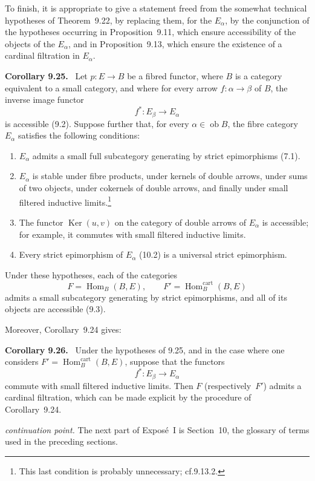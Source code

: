\documentclass[11pt]{article}
\newcommand{\ob}{\operatorname{ob}}
\newcommand{\Ker}{\operatorname{Ker}}
\newcommand{\Hhom}{\operatorname{Hom}}
\newcommand{\Hhomcart}{\operatorname{Hom}^{\mathrm{cart}}}
\newcommand{\cf}{cf.}
\newcommand{\resp}{respectively\ }
\newenvironment{statement}[1]{\par\medskip\noindent\textbf{#1.}\ }{\par\medskip}
\begin{document}
To finish, it is appropriate to give a statement freed from the somewhat technical hypotheses of Theorem~9.22, by replacing them, for the $E_\alpha$, by the conjunction of the hypotheses occurring in Proposition~9.11, which ensure accessibility of the objects of the $E_\alpha$, and in Proposition~9.13, which ensure the existence of a cardinal filtration in $E_\alpha$.

\begin{statement}{Corollary 9.25}
Let $p:E\to B$ be a fibred functor, where $B$ is a category equivalent to a small category, and where for every arrow $f:\alpha\to\beta$ of $B$, the inverse image functor
\[
 f^\ast:E_\beta\to E_\alpha
\]
is accessible (9.2). Suppose further that, for every $\alpha\in\ob B$, the fibre category $E_\alpha$ satisfies the following conditions:
\begin{enumerate}[label=\alph*)]
\item $E_\alpha$ admits a small full subcategory generating by strict epimorphisms (7.1).
\item $E_\alpha$ is stable under fibre products, under kernels of double arrows, under sums of two objects, under cokernels of double arrows, and finally under small filtered inductive limits.\footnote{This last condition is probably unnecessary; \cf 9.13.2.}
\item The functor $\Ker(u,v)$ on the category of double arrows of $E_\alpha$ is accessible; for example, it commutes with small filtered inductive limits.
\item Every strict epimorphism of $E_\alpha$ (10.2) is a universal strict epimorphism.
\end{enumerate}
Under these hypotheses, each of the categories
\[
 F=\Hhom_B(B,E),\qquad F'=\Hhomcart_B(B,E)
\]
admits a small subcategory generating by strict epimorphisms, and all of its objects are accessible (9.3).
\end{statement}

Moreover, Corollary~9.24 gives:

\begin{statement}{Corollary 9.26}
Under the hypotheses of 9.25, and in the case where one considers $F'=\Hhomcart_B(B,E)$, suppose that the functors
\[
 f^\ast:E_\beta\to E_\alpha
\]
commute with small filtered inductive limits. Then $F$ (\resp $F'$) admits a cardinal filtration, which can be made explicit by the procedure of Corollary~9.24.
\end{statement}

\bigskip
\noindent\emph{continuation point.} The next part of Expos\'e~I is Section~10, the glossary of terms used in the preceding sections.
\end{document}
